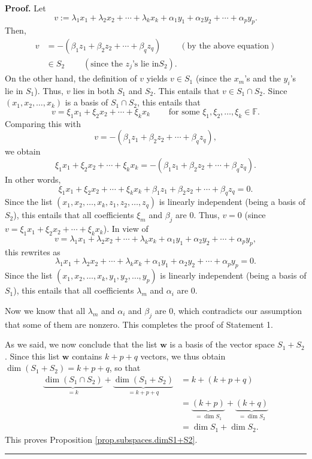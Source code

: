 \documentclass[numbers=enddot,12pt,final,onecolumn,notitlepage]{scrartcl}%
\numberwithin{exer}{subsection}
\theoremstyle{definition}
\newenvironment{proof}[1][Proof]{\noindent\textbf{#1.} }{\ \rule{0.5em}{0.5em}}
\begin{document}
\begin{proof}
Let
\[
v:=\lambda_{1}x_{1}+\lambda_{2}x_{2}+\cdots+\lambda_{k}x_{k}+\alpha_{1}%
y_{1}+\alpha_{2}y_{2}+\cdots+\alpha_{p}y_{p}.
\]
Then,%
\begin{align*}
v  &  =-\left(  \beta_{1}z_{1}+\beta_{2}z_{2}+\cdots+\beta_{q}z_{q}\right)
\ \ \ \ \ \ \ \ \ \ \left(  \text{by the above equation}\right) \\
&  \in S_{2}\ \ \ \ \ \ \ \ \ \ \left(  \text{since the }z_{j}\text{'s lie in
}S_{2}\right)  .
\end{align*}
On the other hand, the definition of $v$ yields $v\in S_{1}$ (since the
$x_{m}$'s and the $y_{i}$'s lie in $S_{1}$). Thus, $v$ lies in both $S_{1}$
and $S_{2}$. This entails that $v\in S_{1}\cap S_{2}$. Since $\left(
x_{1},x_{2},\ldots,x_{k}\right)  $ is a basis of $S_{1}\cap S_{2}$, this
entails that%
\[
v=\xi_{1}x_{1}+\xi_{2}x_{2}+\cdots+\xi_{k}x_{k}\ \ \ \ \ \ \ \ \ \ \text{for
some }\xi_{1},\xi_{2},\ldots,\xi_{k}\in\mathbb{F}.
\]
Comparing this with%
\[
v=-\left(  \beta_{1}z_{1}+\beta_{2}z_{2}+\cdots+\beta_{q}z_{q}\right)  ,
\]
we obtain%
\[
\xi_{1}x_{1}+\xi_{2}x_{2}+\cdots+\xi_{k}x_{k}=-\left(  \beta_{1}z_{1}%
+\beta_{2}z_{2}+\cdots+\beta_{q}z_{q}\right)  .
\]
In other words,%
\[
\xi_{1}x_{1}+\xi_{2}x_{2}+\cdots+\xi_{k}x_{k}+\beta_{1}z_{1}+\beta_{2}%
z_{2}+\cdots+\beta_{q}z_{q}=0.
\]
Since the list $\left(  x_{1},x_{2},\ldots,x_{k},z_{1},z_{2},\ldots
,z_{q}\right)  $ is linearly independent (being a basis of $S_{2}$), this
entails that all coefficients $\xi_{m}$ and $\beta_{j}$ are $0$. Thus, $v=0$
(since $v=\xi_{1}x_{1}+\xi_{2}x_{2}+\cdots+\xi_{k}x_{k}$). In view of%
\[
v=\lambda_{1}x_{1}+\lambda_{2}x_{2}+\cdots+\lambda_{k}x_{k}+\alpha_{1}%
y_{1}+\alpha_{2}y_{2}+\cdots+\alpha_{p}y_{p},
\]
this rewrites as%
\[
\lambda_{1}x_{1}+\lambda_{2}x_{2}+\cdots+\lambda_{k}x_{k}+\alpha_{1}%
y_{1}+\alpha_{2}y_{2}+\cdots+\alpha_{p}y_{p}=0.
\]
Since the list $\left(  x_{1},x_{2},\ldots,x_{k},y_{1},y_{2},\ldots
,y_{p}\right)  $ is linearly independent (being a basis of $S_{1}$), this
entails that all coefficients $\lambda_{m}$ and $\alpha_{i}$ are $0$.

Now we know that all $\lambda_{m}$ and $\alpha_{i}$ and $\beta_{j}$ are $0$,
which contradicts our assumption that some of them are nonzero. This completes
the proof of Statement 1.

As we said, we now conclude that the list $\mathbf{w}$ is a basis of the
vector space $S_{1}+S_{2}$. Since this list $\mathbf{w}$ contains $k+p+q$
vectors, we thus obtain $\dim\left(  S_{1}+S_{2}\right)  =k+p+q$, so that%
\begin{align*}
\underbrace{\dim\left(  S_{1}\cap S_{2}\right)  }_{=k}+\underbrace{\dim\left(
S_{1}+S_{2}\right)  }_{=k+p+q}  &  =k+\left(  k+p+q\right) \\
&  =\underbrace{\left(  k+p\right)  }_{=\dim S_{1}}+\underbrace{\left(
k+q\right)  }_{=\dim S_{2}}\\
&  =\dim S_{1}+\dim S_{2}.
\end{align*}
This proves Proposition \ref{prop.subspaces.dimS1+S2}.
\end{proof}
\end{document}
